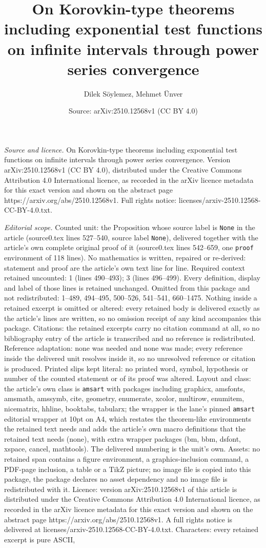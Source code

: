 \documentclass[10pt,a4paper]{amsart}
\title[On Korovkin-type theorems including exponential test functio]{On Korovkin-type theorems including exponential test functions on infinite intervals through power series convergence}
\author{Dilek S\"oylemez, Mehmet \"Unver}
\date{Source: arXiv:2510.12568v1 (CC BY 4.0)}
\begin{document}
\maketitle

\noindent\emph{Source and licence.} On Korovkin-type theorems including exponential test functions on infinite intervals through power series convergence. Version arXiv:2510.12568v1 (CC BY 4.0), distributed under the Creative Commons Attribution 4.0 International licence, as recorded in the arXiv licence metadata for this exact version and shown on the abstract page https://arxiv.org/abs/2510.12568v1. Full rights notice: licenses/arxiv-2510.12568-CC-BY-4.0.txt.\par\smallskip

\noindent\textit{Editorial scope.} Counted unit: the Proposition whose source label is \texttt{None} in the article (source0.tex lines 527--540, source label \texttt{None}), delivered together with the article's own complete original proof of it (source0.tex lines 542--659, one \texttt{proof} environment of 118 lines). No mathematics is written, repaired or re-derived: statement and proof are the article's own text line for line. Required context retained uncounted: 1 (lines 490--493); 3 (lines 496--499). Every definition, display and label of those lines is retained unchanged. Omitted from this package and not redistributed: 1--489, 494--495, 500--526, 541--541, 660--1475. Nothing inside a retained excerpt is omitted or altered: every retained body is delivered exactly as the article's lines are written, so no omission receipt of any kind accompanies this package. Citations: the retained excerpts carry no citation command at all, so no bibliography entry of the article is transcribed and no reference is redistributed. Reference adaptation: none was needed and none was made; every reference inside the delivered unit resolves inside it, so no unresolved reference or citation is produced. Printed slips kept literal: no printed word, symbol, hypothesis or number of the counted statement or of its proof was altered. Layout and class: the article's own class is \texttt{amsart} with packages including graphicx, amsfonts, amsmath, amssymb, cite, geometry, enumerate, xcolor, multirow, enumitem, nicematrix, hhline, booktabs, tabularx; the wrapper is the lane's pinned \texttt{amsart} editorial wrapper at 10pt on A4, which restates the theorem-like environments the retained text needs and adds the article's own macro definitions that the retained text needs (none), with extra wrapper packages (bm, bbm, dsfont, xspace, cancel, mathtools). The delivered numbering is the unit's own. Assets: no retained span contains a figure environment, a graphics-inclusion command, a PDF-page inclusion, a table or a TikZ picture; no image file is copied into this package, the package declares no asset dependency and no image file is redistributed with it. Licence: version arXiv:2510.12568v1 of this article is distributed under the Creative Commons Attribution 4.0 International licence, as recorded in the arXiv licence metadata for this exact version and shown on the abstract page https://arxiv.org/abs/2510.12568v1. A full rights notice is delivered at licenses/arxiv-2510.12568-CC-BY-4.0.txt. Characters: every retained excerpt is pure ASCII, 
\end{document}
